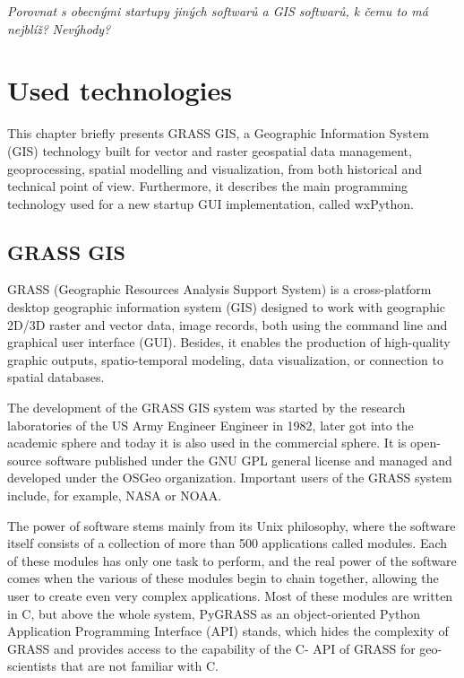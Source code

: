 \documentclass[a4paper,10pt,twoside]{article}
\begin{document}
\textit{\color{red} Porovnat s obecnými startupy jiných softwarů a GIS softwarů, k čemu to má nejblíž?}
\textit{\color{red} Nevýhody?}


\newpage
\vspace*{-1cm}
\section{Used technologies}
\noindent
\large

\noindent This chapter briefly presents GRASS GIS, a Geographic Information System (GIS) technology built for vector and raster geospatial data management, geoprocessing, spatial modelling and visualization, from both historical and technical point of view. Furthermore, it describes the main programming technology used for a new startup GUI implementation, called wxPython.

\subsection{GRASS GIS}
\noindent
\large

\noindent GRASS (Geographic Resources Analysis Support System) is a cross-platform desktop geographic information system (GIS) designed to work with geographic 2D/3D raster and vector data, image records, both using the command line and graphical user interface (GUI). Besides, it enables the production of high-quality graphic outputs, spatio-temporal modeling, data visualization, or connection to spatial databases.

The development of the GRASS GIS system was started by the research laboratories of the US Army Engineer Engineer in 1982, later got into the academic sphere and today it is also used in the commercial sphere. It is open-source software published under the GNU GPL general license and managed and developed under the OSGeo organization. Important users of the GRASS system include, for example, NASA or NOAA.

The power of software stems mainly from its Unix philosophy, where the software itself consists of a collection of more than 500 applications called modules. Each of these modules has only one task to perform, and the real power of the software comes when the various of these modules begin to chain together, allowing the user to create even very complex applications. Most of these modules are written in C, but above the whole system, PyGRASS as an object-oriented Python Application Programming Interface (API) stands, which hides the complexity of GRASS and provides access to the capability of the C- API of GRASS for geo-scientists that are not familiar with C.
\end{document}
